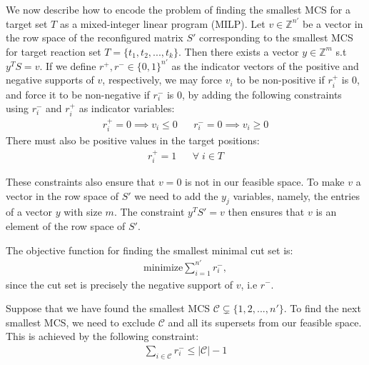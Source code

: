 \documentclass{bioinfo}
\theoremstyle{plain}
\theoremstyle{definition}
\begin{document}
We now describe how to encode the problem of finding the smallest MCS for a target set $T$ as a mixed-integer linear program (MILP). Let $v \in \mathbb{Z}^{n'}$ be a vector in the row space of the reconfigured matrix $S'$ corresponding to the smallest MCS for target reaction set $T=\{t_1, t_2, ..., t_k\}$. Then there exists a vector $y \in \mathbb{Z}^m$ s.t $y^TS = v$. If we define $r^{+}, r^{-} \in \{0, 1\}^{n'}$ as the indicator vectors of the positive and negative supports of $v$, respectively, we may force $v_i$ to be non-positive if $r^{+}_{i}$ is $0$, and force it to be non-negative if $r^{-}_{i}$ is $0$, by adding the following constraints using $r^{-}_{i}$ and $r^{+}_{i}$ as indicator variables:
\begin{align}
    r^{+}_{i} = 0 \implies v_{i} \leq 0 && r^{-}_{i} = 0 \implies v_{i} \geq 0
\end{align}
There must also be positive values in the target positions:
\begin{align} \label{target-constraints}
    r^{+}_{i} = 1 && \forall \; i \in T
\end{align}

These constraints also ensure that $v = 0$ is not in our feasible space. To make $v$ a vector in the row space of $S'$ we need to add the $y_j$ variables, namely, the entries of a vector $y$ with size $m$. The constraint $y^T S' = v$ then ensures that $v$ is an element of the row space of $S'$.

The objective function for finding the smallest minimal cut set is:
\begin{align}\label{objective}
    \text{minimize} \sum_{i=1}^{n'} r^{-}_{i},
\end{align}
since the cut set is precisely the negative support of $v$, i.e $r^-$.

Suppose that we have found the smallest MCS $\mathcal{C} \subsetneq \{1, 2, ..., n'\}$. To find the next smallest MCS, we need to exclude $\mathcal{C}$ and all its supersets from our feasible space. This is achieved by the following constraint:
\begin{align}\label{cs-removal}
    \sum_{i \in \mathcal{C}} r^-_i \leq |\mathcal{C}| - 1
\end{align}
\end{document}
